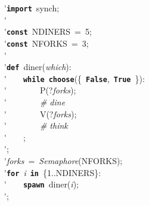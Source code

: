 \'\>\texttt{\textbf{import}}~synch;\\

\'\>\\

\'\>\texttt{\textbf{const}}~NDINERS~=~5;\\

\'\>\texttt{\textbf{const}}~NFORKS~=~3;\\

\'\>\\

\'\>\texttt{\textbf{def}}~diner(\textit{which}):\\

\'\>~~~~\texttt{\textbf{while}}~\texttt{\textbf{choose}}(\{~\texttt{\textbf{False}},~\texttt{\textbf{True}}~\}):\\

\'\>~~~~~~~~P(?\textit{forks});\\

\'\>~~~~~~~~\emph{\# dine}\\

\'\>~~~~~~~~V(?\textit{forks});\\

\'\>~~~~~~~~\emph{\# think}\\

\'\>~~~~;\\

\'\>;\\

\'\>\textit{forks}~=~\textit{Semaphore}(NFORKS);\\

\'\>\texttt{\textbf{for}}~\textit{i}~\texttt{\textbf{in}}~\{1..NDINERS\}:\\

\'\>~~~~\texttt{\textbf{spawn}}~diner(\textit{i});\\

\'\>;